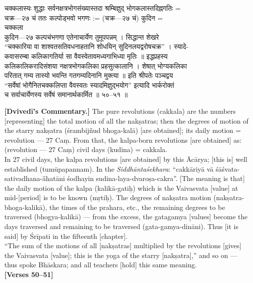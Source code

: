 \documentclass[11pt,a4paper]{article}
\newcommand{\dev}[1]{{\devanagarifont #1}}
\newcommand{\bilingualpair}[2]{%
  \noindent%
  \begin{minipage}[t]{0.48\textwidth}
    #1%
  \end{minipage}%
  \hfill%
  \begin{minipage}[t]{0.48\textwidth}
    #2%
  \end{minipage}%
  \par\vspace{0.5em}%
}
\newenvironment{sanskritcol}{\devanagarifont\small}{}
\newenvironment{englishcol}{\iastfont\small}{}
\begin{document}
\vspace{0.5cm}
\bilingualpair{%
\begin{sanskritcol}
\dev{चक्कलास्यः शुद्धाः सर्वनक्षत्रभोगसंख्यास्तदा श्रम्बिज्ञुद् भोगकलास्तदिह्नगतिः =}\\[0.3em]
\dev{चक्र—२७ चं ततः कल्पोड्भवो भगणः := (चक्र—२७ चं) कुदिन =}\\[0.3em]
\dev{चक्कला}\\[0.3em]
\dev{कुदिन—२७ कल्पचंभगणा एतेनाचार्येण तुमूपपन्नम् । सिद्धान्त शेखरे}\\[0.3em]
\dev{``चक्कारिया वा शाश्वतसतिवधनाहतानि शोधयिन् सुदिनलयद्वरोषचक्र'' । स्यादे-}\\[0.3em]
\dev{कवासरम्बा कलिकागतिर्या सा वैवस्वेतावमध्यगाभिध्या मृतिः ॥ इद्धप्रहस्य}\\[0.3em]
\dev{कलिकालिकरादिसंशया नक्षत्रभोगकलिका प्रहसुत्कालानि । शेषात् भोग्यकलिका}\\[0.3em]
\dev{परितात् गम्य तास्यो भवन्ति गतगम्यदिनानि मुक्त्या ॥ इति श्रीपतेः पञ्चद्वय}\\[0.3em]
\dev{``सर्वेषां भोगैनितचक्कलिप्ता वैवस्वतः स्यादमिज्ञुद्भयोग'' इत्यादि भार्करोक्तं}\\[0.3em]
\dev{च सर्वाचार्येणस्य सर्वेषं समानार्थकार्मित ॥ ५०--५१ ॥}
\end{sanskritcol}%
}{%
\begin{englishcol}
\textbf{[Dvivedī's Commentary.]} The pure revolutions (cakkala) are the numbers [representing] the total motion of all the nakṣatras; then the degrees of motion of the starry nakṣatra (\'srambijñud bhoga-kalā) [are obtained]; its daily motion = revolution --- 27 Caṃ. From that, the kalpa-born revolutions [are obtained] as: (revolution --- 27 Caṃ) civil days (kudina) = cakkala.\\[0.3em]
In 27 civil days, the kalpa revolutions [are obtained] by this Ācārya; [this is] well established (tumūpapannam). In the \textit{Siddhānta\'sek\-{}hara}: ``cakkāriyā vā śāśvata-sativadhana-\=āhatāni śodhayin sudina-laya-dvaroṣa-cakra''. [The meaning is that] the daily motion of the kalpa (kalikā-gatiḥ) which is the Vaivasvata [value] at mid-[period] is to be known (mṛtiḥ). The degrees of nakṣatra motion (nakṣatra-bhoga-kalikā), the times of the prahara, etc., the remaining degrees to be traversed (bhogya-kalikā) --- from the excess, the gatagamya [values] become the days traversed and remaining to be traversed (gata-gamya-dināni). Thus [it is said] by Śrīpati in the fifteenth [chapter].\\[0.3em]
``The sum of the motions of all [nakṣatras] multiplied by the revolutions [gives] the Vaivasvata [value]; this is the yoga of the starry [nakṣatra],'' and so on --- thus spoke Bhāskara; and all teachers [hold] this same meaning.\\[0.3em]
\hfill \textbf{[Verses 50--51]}
\end{englishcol}%
}
\end{document}
